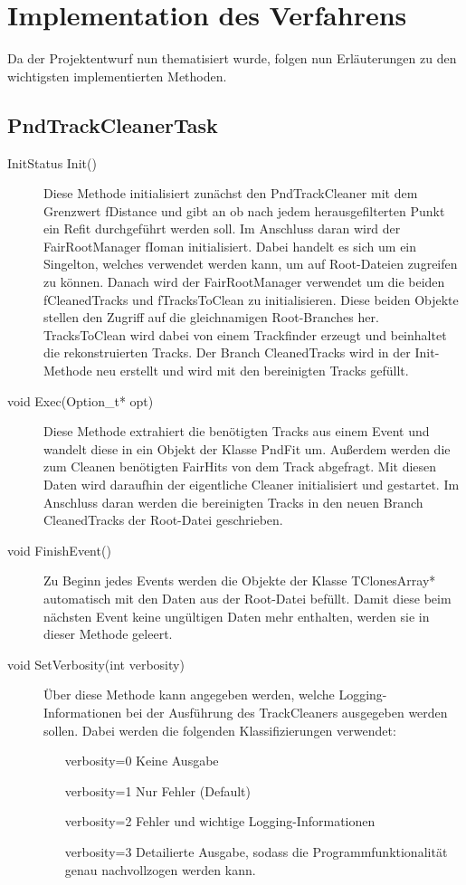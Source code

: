 \section{Implementation des Verfahrens}
Da der Projektentwurf nun thematisiert wurde, folgen nun Erläuterungen zu den wichtigsten implementierten Methoden.

\subsection{PndTrackCleanerTask}
\begin{description}
	\item[InitStatus Init()] Diese Methode initialisiert zunächst den PndTrackCleaner mit dem Grenzwert fDistance und gibt an ob nach jedem herausgefilterten Punkt ein Refit durchgeführt werden soll. Im Anschluss daran wird der FairRootManager fIoman initialisiert. Dabei handelt es sich um ein Singelton, welches verwendet werden kann, um auf Root-Dateien zugreifen zu können. Danach wird der FairRootManager verwendet um die beiden  fCleanedTracks und fTracksToClean zu initialisieren. Diese beiden Objekte stellen den Zugriff auf die gleichnamigen Root-Branches her. TracksToClean wird dabei von einem Trackfinder erzeugt und beinhaltet die rekonstruierten Tracks. Der Branch CleanedTracks wird in der Init-Methode neu erstellt und wird mit den bereinigten Tracks gefüllt.
	
	\item[void Exec(Option\_t* opt)] Diese Methode extrahiert die benötigten Tracks aus einem Event und wandelt diese in ein Objekt der Klasse PndFit um. Außerdem werden die zum Cleanen benötigten FairHits von dem Track abgefragt. Mit diesen Daten wird daraufhin der eigentliche Cleaner initialisiert und gestartet. Im Anschluss daran werden die bereinigten Tracks in den neuen Branch CleanedTracks der Root-Datei geschrieben.
	
	\item[void FinishEvent()] Zu Beginn jedes Events werden die Objekte der Klasse TClonesArray* automatisch mit den Daten aus der Root-Datei befüllt. Damit diese beim nächsten Event keine ungültigen Daten mehr enthalten, werden sie in dieser Methode geleert.
	
	\item[void SetVerbosity(int verbosity)] Über diese Methode kann angegeben werden, welche Logging-Informationen bei der Ausführung des TrackCleaners ausgegeben werden sollen. Dabei werden die folgenden Klassifizierungen verwendet:
	\begin{enumerate}
		\item[verbosity=0] Keine Ausgabe
		\item[verbosity=1] Nur Fehler (Default)
		\item[verbosity=2] Fehler und wichtige Logging-Informationen
		\item[verbosity=3] Detailierte Ausgabe, sodass die Programmfunktionalität genau nachvollzogen werden kann.
	\end{enumerate}
	

\end{description}
